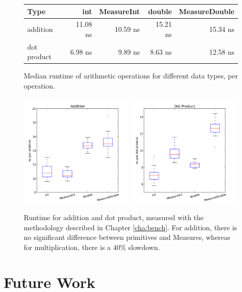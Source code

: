\documentclass[12pt,oneside,a4paper]{scrbook}
\begin{document}
\begin{figure}
\begin{tabular}{lrrrr}
Type            & int      & MeasureInt  & double    & MeasureDouble \\
\midrule
addition        & 11.08 ns &  10.59 ns   &  15.21 ns &  15.34 ns             \\
dot product     &  6.98 ns &   9.89 ns   &   8.63 ns &  12.58 ns
\end{tabular}
\caption{Median runtime of arithmetic operations for different data types, per operation.}
\label{bench:scala_measures}
\end{figure}


\begin{figure}[htb]
\centering
\includegraphics[width=0.49\textwidth]{boxplot_add.png}
\includegraphics[width=0.49\textwidth]{boxplot_mul.png}
\caption{Runtime for addition and dot product, measured with the methodology described in Chapter \ref{cha:bench}. For addition, there is no significant difference between primitives and Measures, whereas for multiplication, there is a 40\% slowdown.}
\label{fig:rome}
\end{figure}




\chapter{Future Work}
\end{document}
